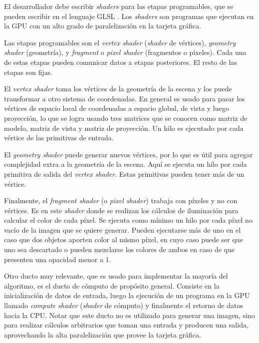 El desarrollador debe escribir \textit{shaders} para las etapas programables, que se pueden escribir en el lenguaje GLSL \cite{glsl-spec}.
Los \textit{shaders} son programas que ejecutan en la GPU con un alto grado de paralelización en la tarjeta gráfica.

Las etapas programables son el \textit{vertex shader} (\textit{shader} de vértices), \textit{geometry shader} (geometría), y \textit{fragment} o \textit{pixel shader} (fragmentos o píxeles).
Cada una de estas etapas pueden comunicar datos a etapas posteriores.
El resto de las etapas son fijas.

El \textit{vertex shader} toma los vértices de la geometría de la escena y los puede transformar a otro sistema de coordenadas.
En general es usado para pasar los vértices de espacio local de coordenadas a espacio global, de vista y luego proyección, lo que se logra usando tres matrices que se conocen como matriz de modelo, matriz de vista y matriz de proyección.
Un hilo es ejecutado por cada vértice de las primitivas de entrada.

El \textit{geometry shader} puede generar nuevos vértices, por lo que es útil para agregar complejidad extra a la geometría de la escena.
Aquí se ejecuta un hilo por cada primitiva de salida del \textit{vertex shader}.
Estas primitivas pueden tener más de un vértice.

Finalmente, el \textit{fragment shader} (o \textit{pixel shader}) trabaja con píxeles y no con vértices.
Es en este \textit{shader} donde se realizan los cálculos de iluminación para calcular el color de cada píxel.
Se ejecuta como mínimo un hilo por cada píxel no vacío de la imagen que se quiere generar.
Pueden ejecutarse más de uno en el caso que dos objetos aporten color al mismo píxel, en cuyo caso puede ser que uno sea descartado o pueden mezclarse los colores de ambos en caso de que presenten una opacidad menor a 1.

Otro ducto muy relevante, que es usado para implementar la mayoría del algoritmo, es el ducto de cómputo de propósito general.
Consiste en la inicialización de datos de entrada, luego la ejecución de un programa en la GPU llamado \textit{compute shader} (\textit{shader} de cómputo) y finalmente el retorno de datos hacia la CPU.
Notar que este ducto no es utilizado para generar una imagen, sino para realizar cálculos arbitrarios que toman una entrada y producen una salida, aprovechando la alta paralelización que provee la tarjeta gráfica.


